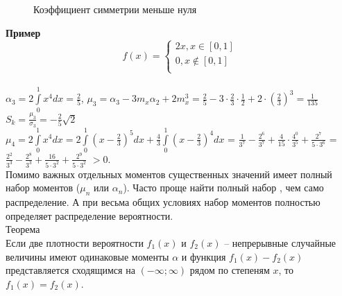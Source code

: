 \documentclass[russian, 12pt, fleqn,x11names]{article}
\begin{document}
\begin{figure}[H]
\caption{Коэффициент симметрии меньше нуля}
\end{figure}
\noindent
\textbf{Пример\ }\\
\begin{equation*} 
f(x)=
 \begin{cases}
   2x,  x \in [0, 1]\\
   0 , x \notin [0, 1]\\
 \end{cases}
\end{equation*}\\
$\alpha_3 = 2\int\limits_{0}^{1}x^4dx=\frac{2}{5}$, $\mu_3 = \alpha_3 - 3m_x\alpha_2 + 2m_x^3 = \frac{2}{5} - 3\cdot\frac{2}{3}\cdot\frac{1}{2} + 2 \cdot (\frac{2}{3})^3 = \frac{1}{135}$\\
$S_k = \frac{\mu_3}{\sigma_3} = -\frac{2}{5}\sqrt2$\\
$\mu_4 = 2\int\limits_0^1x^4dx=2\int\limits_0 ^1(x-\frac{2}{3})^5dx + \frac{4}{3}\int\limits_{0}^{1}(x-\frac{2}{3})^4dx$ = $\frac{1}{3^7} - \frac{2^6}{3^7} + \frac{4}{15} \cdot \frac{4^0}{3^5} + \frac{2^7}{5\cdot3^6}$ = $\frac{2^2}{3^3} - \frac{2^8}{3^3} + \frac{16}{5\cdot3^2} + \frac{2^9}{5\cdot3^2}$ $>0$.\\
Помимо важных отдельных моментов существенных значений имеет полный набор моментов ($\mu_n$ или $\alpha_n$). Часто проще найти полный набор %
, чем само распределение. А при весьма общих условиях набор моментов полностью определяет распределение вероятности.\\
$\textbf{Теорема}$\\
Если две плотности вероятности $f_1(x)$ и $f_2(x)$ -- непрерывные случайные величины имеют одинаковые моменты $\alpha$ и функция $f_1(x) - f_2(x)$ представляется сходящимся на $(-\infty;\infty)$ рядом по степеням $x$, то $f_1(x) = f_2(x)$.\\
\end{document}
